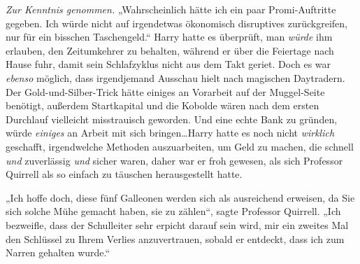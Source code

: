 \emph{Zur Kenntnis genommen.}
„Wahrscheinlich hätte ich ein paar Promi-Auftritte gegeben. Ich würde nicht auf irgendetwas ökonomisch disruptives zurückgreifen, nur für ein bisschen Taschengeld.“ Harry hatte es überprüft, man \emph{würde} ihm erlauben, den Zeitumkehrer zu behalten, während er über die Feiertage nach Hause fuhr, damit sein Schlafzyklus nicht aus dem Takt geriet. Doch es war \emph{ebenso} möglich, dass irgendjemand Ausschau hielt nach magischen Daytradern.%
Der Gold-und-Silber-Trick hätte einiges an Vorarbeit auf der Muggel-Seite benötigt, außerdem Startkapital und die Kobolde wären nach dem ersten Durchlauf vielleicht misstrauisch geworden. Und eine echte Bank zu gründen, würde \emph{einiges} an Arbeit mit sich bringen…Harry hatte es noch nicht \emph{wirklich} geschafft, irgendwelche Methoden auszuarbeiten, um Geld zu machen, die schnell \emph{und} zuverlässig \emph{und} sicher waren, daher war er froh gewesen, als sich Professor Quirrell als so einfach zu täuschen herausgestellt hatte.

„Ich hoffe doch, diese fünf Galleonen werden sich als ausreichend erweisen, da Sie sich solche Mühe gemacht haben, sie zu zählen“, sagte Professor Quirrell.
„Ich bezweifle, dass der Schulleiter sehr erpicht darauf sein wird, mir ein zweites Mal den Schlüssel zu Ihrem Verlies anzuvertrauen, sobald er entdeckt, dass ich zum Narren gehalten wurde.“

